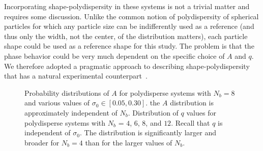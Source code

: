 Incorporating shape-polydispersity in these systems is not a trivial matter and requires some discussion.  
Unlike the common notion of polydispersity of spherical particles  for which any particle size can be indifferently used as a reference (and thus only the width, not the center, of the distribution matters), each particle shape could be used as a reference shape for this study. 
The problem is that the phase behavior could be very much dependent on the specific choice of $A$ and $q$.
We therefore adopted a pragmatic approach to describing shape-polydispersity  that has a natural experimental counterpart~\cite{weitz}. 

\begin{figure}
	\begin{center}

	\end{center}
	\caption[$A$ and $q$ distributions for different values of $\sigma_0$ and $N_b$]{ Probability distributions of $A$ for polydisperse systems with $N_b = 8$ and various values of $\sigma_0 \in [0.05,0.30]$.  the $A$ distribution is approximately independent of $N_b$.   Distribution of $q$ values for polydisperse systems with $N_b$ = $4$, $6$, $8$, and $12$.  Recall that $q$ is independent of $\sigma_0$.  The distribution is significantly larger and broader for $N_b = 4$ than for the larger values of $N_b$.}\label{histograms}
\end{figure}

